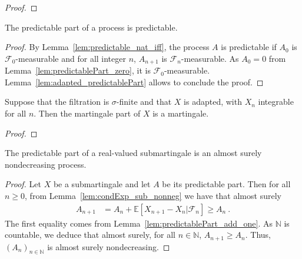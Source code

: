 \begin{proof}\mathlibok

\end{proof}


\begin{lemma}\label{lem:predictable_predictablePart}
  \mathlibok
The predictable part of a process is predictable.
\end{lemma}

\begin{proof}\leanok
By Lemma~\ref{lem:predictable_nat_iff}, the process $A$ is predictable if $A_0$ is $\mathcal{F}_0$-measurable and for all integer $n$, $A_{n+1}$ is $\mathcal{F}_n$-measurable. As $A_0 = 0$ from Lemma~\ref{lem:predictablePart_zero}, it is $\mathcal{F}_0$-measurable. Lemma~\ref{lem:adapted_predictablePart} allows to conclude the proof.
\end{proof}


\begin{lemma}\label{lem:martingale_martingalePart}
  \mathlibok
Suppose that the filtration is $\sigma$-finite and that $X$ is adapted, with $X_n$ integrable for all $n$.
Then the martingale part of $X$ is a martingale.
\end{lemma}

\begin{proof}\leanok

\end{proof}


\begin{lemma}\label{lem:Submartingale.monotone_predictablePart}
  \mathlibok
The predictable part of a real-valued submartingale is an almost surely nondecreasing process.
\end{lemma}

\begin{proof}\leanok
Let $X$ be a submartingale and let $A$ be its predictable part. Then for all $n \geq 0$, from Lemma~\ref{lem:condExp_sub_nonneg} we have that almost surely
\begin{align*}
  A_{n+1} &= A_n + \mathbb{E}\left[ X_{n+1} - X_n | \mathcal{F}_n \right]
  \ge A_n
  \: .
\end{align*}
The first equality comes from Lemma~\ref{lem:predictablePart_add_one}. As $\mathbb{N}$ is countable, we deduce that almost surely, for all $n \in \mathbb{N}$, $A_{n+1} \ge A_n$.
Thus, $(A_n)_{n \in \mathbb{N}}$ is almost surely nondecreasing.
\end{proof}


